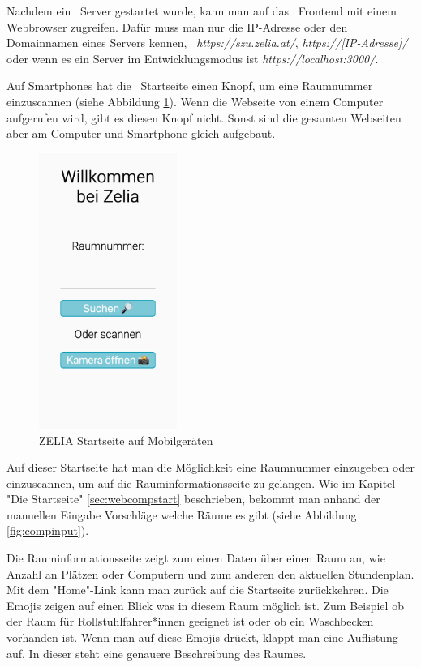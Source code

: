 Nachdem ein \ZELIA\ Server gestartet wurde, kann man auf das \ZELIA\ Frontend mit einem Webbrowser zugreifen. Dafür muss man nur die IP-Adresse oder den Domainnamen eines Servers kennen, \zb\ \emph{https://szu.zelia.at/}, \emph{https://[IP-Adresse]/} oder wenn es ein Server im Entwicklungsmodus ist \emph{https://localhost:3000/}.

Auf Smartphones hat die \ZELIA\ Startseite einen Knopf, um eine Raumnummer einzuscannen (siehe Abbildung \ref{fig:zeliastart}). Wenn die Webseite von einem Computer aufgerufen wird, gibt es diesen Knopf nicht. Sonst sind die gesamten Webseiten aber am Computer und Smartphone gleich aufgebaut.

\begin{figure}[H]
    \centering
    \includegraphics[height=90mm]{media/Handbuch/zelia_start.png}
    \caption{ZELIA Startseite auf Mobilgeräten}
    \label{fig:zeliastart}
\end{figure}

Auf dieser Startseite hat man die Möglichkeit eine Raumnummer einzugeben oder einzuscannen, um auf die Rauminformationsseite zu gelangen. Wie im Kapitel "Die Startseite" \ref{sec:webcompstart} beschrieben, bekommt man anhand der manuellen Eingabe Vorschläge welche Räume es gibt (siehe Abbildung \ref{fig:compinput}). 

Die Rauminformationsseite zeigt zum einen Daten über einen Raum an, wie Anzahl an Plätzen oder Computern und zum anderen den aktuellen Stundenplan. Mit dem "Home"-Link kann man zurück auf die Startseite zurückkehren. Die Emojis zeigen auf einen Blick was in diesem Raum möglich ist. Zum Beispiel ob der Raum für Rollstuhlfahrer*innen geeignet ist oder ob ein Waschbecken vorhanden ist. Wenn man auf diese Emojis drückt, klappt man eine Auflistung auf. In dieser steht eine genauere Beschreibung des Raumes.

